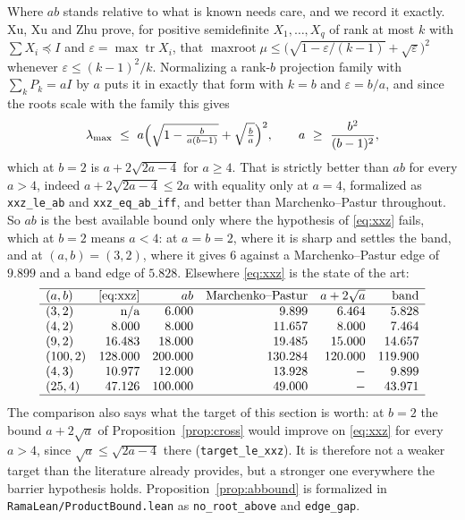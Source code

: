 \documentclass[11pt]{article}
\theoremstyle{remark}
\begin{document}
Where $ab$ stands relative to what is known needs care, and we record it exactly. Xu, Xu
and Zhu \cite[Thm.~1.9]{XXZ} prove, for positive semidefinite $X_1,\dots,X_q$ of rank at
most $k$ with $\sum X_i\preceq I$ and $\varepsilon=\max\operatorname{tr}X_i$, that
$\operatorname{maxroot}\mu\le\bigl(\sqrt{1-\varepsilon/(k-1)}+\sqrt\varepsilon\bigr)^2$
whenever $\varepsilon\le(k-1)^2/k$. Normalizing a rank-$b$ projection family with
$\sum_kP_k=aI$ by $a$ puts it in exactly that form with $k=b$ and $\varepsilon=b/a$, and
since the roots scale with the family this gives
\begin{equation}\label{eq:xxz}
\lambda_{\max}\ \le\ a\Bigl(\sqrt{1-\tfrac{b}{a(b-1)}}+\sqrt{\tfrac ba}\Bigr)^{2},
\qquad a\ \ge\ \frac{b^2}{(b-1)^2},
\end{equation}
which at $b=2$ is $a+2\sqrt{2a-4}$ for $a\ge4$. That is strictly better than $ab$ for
every $a>4$, indeed $a+2\sqrt{2a-4}\le2a$ with equality only at $a=4$, formalized as
\texttt{xxz\_le\_ab} and \texttt{xxz\_eq\_ab\_iff}, and better than
Marchenko--Pastur throughout. So $ab$ is the best available bound only where the
hypothesis of \eqref{eq:xxz} fails, which at $b=2$ means $a<4$: at $a=b=2$, where it is
sharp and settles the band, and at $(a,b)=(3,2)$, where it gives $6$ against a
Marchenko--Pastur edge of $9.899$ and a band edge of $5.828$. Elsewhere \eqref{eq:xxz} is
the state of the art:
\[
\begin{array}{lrrrrr}
\hline
(a,b) & \eqref{eq:xxz} & ab & \text{Marchenko--Pastur} & a+2\sqrt a & \text{band}\\
\hline
(3,2) & \text{n/a} & 6.000 & 9.899 & 6.464 & 5.828\\
(4,2) & 8.000 & 8.000 & 11.657 & 8.000 & 7.464\\
(9,2) & 16.483 & 18.000 & 19.485 & 15.000 & 14.657\\
(100,2) & 128.000 & 200.000 & 130.284 & 120.000 & 119.900\\
(4,3) & 10.977 & 12.000 & 13.928 & - & 9.899\\
(25,4) & 47.126 & 100.000 & 49.000 & - & 43.971\\
\hline
\end{array}
\]
The comparison also says what the target of this section is worth: at $b=2$ the bound
$a+2\sqrt a$ of Proposition~\ref{prop:cross} would improve on \eqref{eq:xxz} for every
$a>4$, since $\sqrt a\le\sqrt{2a-4}$ there (\texttt{target\_le\_xxz}). It is therefore
not a weaker target than the literature already provides, but a stronger one everywhere
the barrier hypothesis holds. Proposition~\ref{prop:abbound} is formalized in
\texttt{RamaLean/ProductBound.lean} as \texttt{no\_root\_above} and
\texttt{edge\_gap}.
\end{document}
